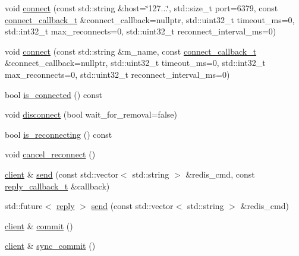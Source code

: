 \begin{DoxyCompactItemize}
void \mbox{\hyperlink{classcpp__redis_1_1client_adda8b3e7b4f9c80ac052753b39178dd5}{connect}} (const std\+::string \&host=\char`\"{}127...\char`\"{}, std\+::size\+\_\+t port=6379, const \mbox{\hyperlink{classcpp__redis_1_1client_a8e8f308847caf0b9ce06b817253c65c7}{connect\+\_\+callback\+\_\+t}} \&connect\+\_\+callback=nullptr, std\+::uint32\+\_\+t timeout\+\_\+ms=0, std\+::int32\+\_\+t max\+\_\+reconnects=0, std\+::uint32\+\_\+t reconnect\+\_\+interval\+\_\+ms=0)
\item 
void \mbox{\hyperlink{classcpp__redis_1_1client_a15bcb0885129480543482a7da52af892}{connect}} (const std\+::string \&m_name, const \mbox{\hyperlink{classcpp__redis_1_1client_a8e8f308847caf0b9ce06b817253c65c7}{connect\+\_\+callback\+\_\+t}} \&connect\+\_\+callback=nullptr, std\+::uint32\+\_\+t timeout\+\_\+ms=0, std\+::int32\+\_\+t max\+\_\+reconnects=0, std\+::uint32\+\_\+t reconnect\+\_\+interval\+\_\+ms=0)
\item 
bool \mbox{\hyperlink{classcpp__redis_1_1client_a378682dda2753feff4c174679bd0f9d5}{is\+\_\+connected}} () const
\item 
void \mbox{\hyperlink{classcpp__redis_1_1client_a292252b61bcfdf9ad3854b54b7fe2740}{disconnect}} (bool wait\+\_\+for\+\_\+removal=false)
\item 
bool \mbox{\hyperlink{classcpp__redis_1_1client_ada3dc63edcf04c7db8ffa027bbe85da8}{is\+\_\+reconnecting}} () const
\item 
void \mbox{\hyperlink{classcpp__redis_1_1client_a0ad596a7cd553e18f75cdd78a99d1b05}{cancel\+\_\+reconnect}} ()
\item 
\mbox{\hyperlink{classcpp__redis_1_1client}{client}} \& \mbox{\hyperlink{classcpp__redis_1_1client_a490ef812b666e6d845fcacc808b87bc1}{send}} (const std\+::vector$<$ std\+::string $>$ \&redis\+\_\+cmd, const \mbox{\hyperlink{classcpp__redis_1_1client_af7a65eb21aa25230bfbb0b0203c4fc04}{reply\+\_\+callback\+\_\+t}} \&callback)
\item 
std\+::future$<$ \mbox{\hyperlink{classcpp__redis_1_1reply}{reply}} $>$ \mbox{\hyperlink{classcpp__redis_1_1client_ad6216d6587d50694c16d68e8e182b0be}{send}} (const std\+::vector$<$ std\+::string $>$ \&redis\+\_\+cmd)
\item 
\mbox{\hyperlink{classcpp__redis_1_1client}{client}} \& \mbox{\hyperlink{classcpp__redis_1_1client_a18e123faf9400013ad2f1063e5824dc0}{commit}} ()
\item 
\mbox{\hyperlink{classcpp__redis_1_1client}{client}} \& \mbox{\hyperlink{classcpp__redis_1_1client_ad7d61dadf264bcf27092d9f7f3ff1fd7}{sync\+\_\+commit}} ()

\end{DoxyCompactItemize}
